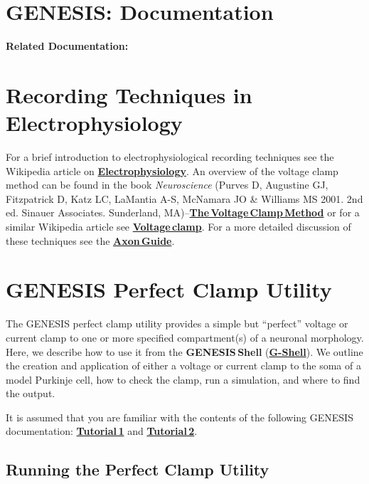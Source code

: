 \documentclass[12pt]{article}
\begin{document}
\section*{GENESIS: Documentation}

{\bf Related Documentation:}

\section*{Recording Techniques in Electrophysiology}

For a brief introduction to electrophysiological recording techniques see the Wikipedia article on \href{http://en.wikipedia.org/wiki/Electrophysiology#Current_clamp}{\bf Electrophysiology}. An overview of the voltage clamp method can be found in the book {\it Neuroscience} (Purves D, Augustine GJ,  Fitzpatrick D, Katz LC, LaMantia A-S, McNamara JO \& Williams MS 2001. 2nd ed. Sinauer Associates. Sunderland, MA)--\href{http://www.ncbi.nlm.nih.gov/bookshelf/br.fcgi?book=neurosci&part=A174}{\bf The\,Voltage\,Clamp\,Method} or for a similar Wikipedia article see \href{http://en.wikipedia.org/wiki/Voltage_clamp}{\bf Voltage\,clamp}. For a more detailed discussion of these techniques see the \href{http://www.moleculardevices.com/pages/instruments/axon_guide.html}{\bf Axon\,Guide}.

\section*{GENESIS Perfect Clamp Utility}

The GENESIS perfect clamp utility provides a simple but ``perfect'' voltage or current clamp to one or more specified compartment(s) of a neuronal morphology. Here, we describe how to use it from the {\bf GENESIS\,Shell} (\href{../gshell/gshell.tex}{\bf G-Shell}). We outline the creation and application of either a voltage or current clamp to the soma of a model Purkinje cell, how to check the clamp, run a simulation, and where to find the output.

It is assumed that you are familiar with the contents of the following GENESIS documentation: \href{../tutorial1/tutorial1.tex}{\bf Tutorial\,1} and \href{../tutorial2/tutorial2.tex}{\bf Tutorial\,2}.

\subsection*{Running the Perfect Clamp Utility}
\end{document}
